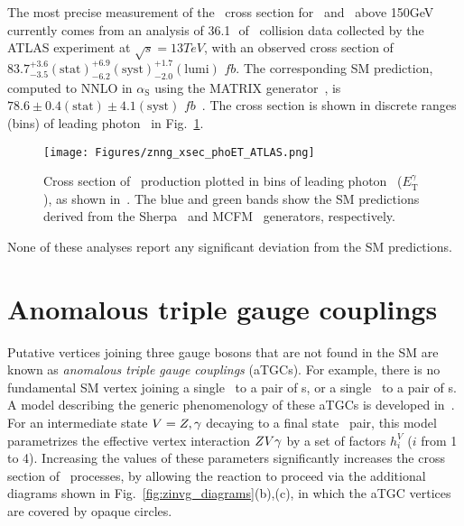 The most precise measurement of the \zinvg\ cross section for \pTgamma\ and \MET\ above 150\unit{GeV} currently comes from an analysis of 36.1\,\fbinv\ of \Pp\Pp\ collision data
collected by the ATLAS experiment at $\sqrt{s} = 13\unit{TeV}$, with an observed cross section of $83.7^{+3.6}_{-3.5}\mathrm{(stat)}^{+6.9}_{-6.2}\mathrm{(syst)}^{+1.7}_{-2.0}\mathrm{(lumi)}$ $fb$.
The corresponding SM prediction, computed to NNLO in $\alpha_\mathrm{S}$ using the MATRIX generator~\cite{ref:epjc/s10052-018-5771-7}, is $78.6 \pm 0.4\mathrm{(stat)} \pm 4.1\mathrm{(syst)}$ $fb$~\cite{ref:CERN-EP-2018-220}.
The cross section is shown in discrete ranges (bins) of leading photon \pT\ in Fig.~\ref{fig:znng_xsec_phoET_ATLAS}.

\begin{figure}[hbtp]
  \begin{center}
    \texttt{[image: Figures/znng\_xsec\_phoET\_ATLAS.png]}
    \caption{
      Cross section of \zinvg\ production plotted in bins of leading photon \pT\ ($E^{\gamma}_\mathrm{T}$), as shown in~\cite{ref:CERN-EP-2018-220}.
      The blue and green bands show the SM predictions derived from the Sherpa~\cite{ref:1126-6708/2009/02/007} and MCFM~\cite{ref:JHEP07(2011)018} generators, respectively.
    }
    \label{fig:znng_xsec_phoET_ATLAS}
  \end{center}
\end{figure}

None of these analyses report any significant deviation from the SM predictions.

\section{Anomalous triple gauge couplings} \label{sec:introduction_aTGC}
Putative vertices joining three gauge bosons that are not found in the SM are known as \textit{anomalous triple gauge couplings} (aTGCs).
For example, there is no fundamental SM vertex joining a single \Pgamma\ to a pair of \PZ s, or a single \PZ\ to a pair of \Pgamma s. A model
describing the generic phenomenology of these aTGCs is developed in~\cite{ref:Nucl.Phys.0550-3213_87_90685-7, ref:PhysRevD.47.4889, ref:PhysRevD.62.113011}.
For an intermediate state $V = Z,\gamma$ decaying to a final state \PZ\Pgamma\ pair, this model parametrizes the effective vertex interaction $Z V\gamma$
by a set of factors $h_{i}^{V}$ ($i$ from 1 to 4). Increasing the values of these parameters significantly increases the cross section
of \zinvg\ processes, by allowing the reaction to proceed via the additional diagrams shown in Fig.~\ref{fig:zinvg_diagrams}(b),(c),
in which the aTGC vertices are covered by opaque circles.

